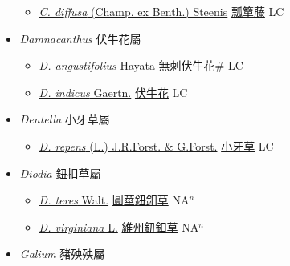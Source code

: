 \begin{itemize}
  \begin{itemize}
        \item[] \href{http://www.theplantlist.org/tpl1.1/search?q=Coptosapelta+diffusa}{\textit{C. diffusa} (Champ. ex Benth.) Steenis}   \href{\detokenize{http://taibnet.sinica.edu.tw/chi/taibnet_species_list.php?T2=瓢簞藤&T2_new_value=true&fr=y}}{瓢簞藤} LC
  \end{itemize}
 \item[] \textit{Damnacanthus} 伏牛花屬
                    
  \begin{itemize}
        \item[] \href{http://www.theplantlist.org/tpl1.1/search?q=Damnacanthus+angustifolius}{\textit{D. angustifolius} Hayata}   \href{\detokenize{http://taibnet.sinica.edu.tw/chi/taibnet_species_list.php?T2=無刺伏牛花&T2_new_value=true&fr=y}}{無刺伏牛花}\# LC
        \item[] \href{http://www.theplantlist.org/tpl1.1/search?q=Damnacanthus+indicus}{\textit{D. indicus} Gaertn.}   \href{\detokenize{http://taibnet.sinica.edu.tw/chi/taibnet_species_list.php?T2=伏牛花&T2_new_value=true&fr=y}}{伏牛花} LC
  \end{itemize}
 \item[] \textit{Dentella} 小牙草屬
                    
  \begin{itemize}
        \item[] \href{http://www.theplantlist.org/tpl1.1/search?q=Dentella+repens}{\textit{D. repens} (L.) J.R.Forst. \& G.Forst.}   \href{\detokenize{http://taibnet.sinica.edu.tw/chi/taibnet_species_list.php?T2=小牙草&T2_new_value=true&fr=y}}{小牙草} LC
  \end{itemize}
 \item[] \textit{Diodia} 鈕扣草屬
                    
  \begin{itemize}
        \item[] \href{http://www.theplantlist.org/tpl1.1/search?q=Diodia+teres}{\textit{D. teres} Walt.}   \href{\detokenize{http://taibnet.sinica.edu.tw/chi/taibnet_species_list.php?T2=圓莖鈕釦草&T2_new_value=true&fr=y}}{圓莖鈕釦草} NA$^n$
        \item[] \href{http://www.theplantlist.org/tpl1.1/search?q=Diodia+virginiana}{\textit{D. virginiana} L.}   \href{\detokenize{http://taibnet.sinica.edu.tw/chi/taibnet_species_list.php?T2=維州鈕釦草&T2_new_value=true&fr=y}}{維州鈕釦草} NA$^n$
  \end{itemize}
 \item[] \textit{Galium} 豬殃殃屬
                    

\end{itemize}
